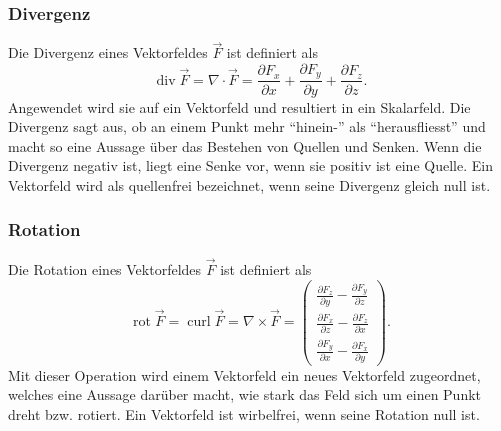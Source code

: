 \subsubsection{Divergenz}
Die Divergenz eines Vektorfeldes $\vec{F}$ ist definiert als 
\[ \operatorname{div}\vec{F} = \nabla\cdot\vec{F} 
= \frac{\partial F_x}{\partial x} + \frac{\partial F_y}{\partial y} + \frac{\partial F_z}{\partial z}. \]
Angewendet wird sie auf ein Vektorfeld und resultiert in ein Skalarfeld.
Die Divergenz sagt aus, ob an einem Punkt mehr ``hinein-'' als ``herausfliesst'' und macht so eine Aussage über das Bestehen von Quellen und Senken. 
Wenn die Divergenz negativ ist, liegt eine Senke vor, wenn sie positiv ist eine Quelle.
Ein Vektorfeld wird als quellenfrei bezeichnet, wenn seine Divergenz gleich null ist.

\subsubsection{Rotation}
Die Rotation eines Vektorfeldes $\vec{F}$ ist definiert als
\[
\renewcommand{\arraystretch}{1.9} 
\operatorname{rot}\vec{F} = 
\operatorname{curl}\vec{F}
=\nabla\times\vec{F}
= \begin{pmatrix}
	\displaystyle
	\frac{\partial F_z}{\partial y} -\frac{\partial F_y}{\partial z}\\
	\displaystyle
	\frac{\partial F_x}{\partial z} -\frac{\partial F_z}{\partial x}\\
	\displaystyle
	\frac{\partial F_y}{\partial x} -\frac{\partial F_x}{\partial y}
\end{pmatrix}
. \]
Mit dieser Operation wird einem Vektorfeld ein neues Vektorfeld zugeordnet, welches eine Aussage darüber macht, wie stark das Feld sich um einen Punkt dreht bzw. rotiert.
Ein Vektorfeld ist wirbelfrei, wenn seine Rotation null ist.
